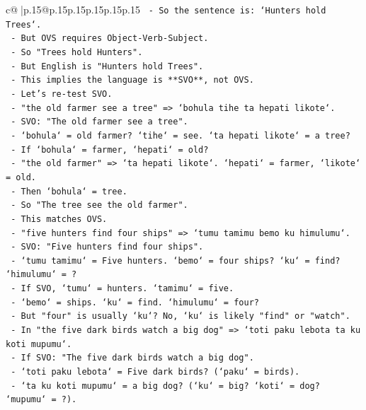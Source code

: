 \documentclass{article}
\begin{document}
{\begin{supertabular}{c@{$\;$}|p{.15\linewidth}@{}p{.15\linewidth}p{.15\linewidth}p{.15\linewidth}p{.15\linewidth}p{.15\linewidth}}
{{{\texttt{      {-} So the sentence is: `Hunters hold Trees`.} \\
\texttt{      {-} But OVS requires Object{-}Verb{-}Subject.} \\
\texttt{      {-} So "Trees hold Hunters".} \\
\texttt{      {-} But English is "Hunters hold Trees".} \\
\texttt{      {-} This implies the language is **SVO**, not OVS.} \\
\texttt{      {-} Let's re{-}test SVO.} \\
\texttt{      {-} "the old farmer see a tree" => `bohula tihe ta hepati likote`.} \\
\texttt{        {-} SVO: "The old farmer see a tree".} \\
\texttt{        {-} `bohula` = old farmer? `tihe` = see. `ta hepati likote` = a tree?} \\
\texttt{        {-} If `bohula` = farmer, `hepati` = old?} \\
\texttt{        {-} "the old farmer" => `ta hepati likote`. `hepati` = farmer, `likote` = old.} \\
\texttt{        {-} Then `bohula` = tree.} \\
\texttt{        {-} So "The tree see the old farmer".} \\
\texttt{        {-} This matches OVS.} \\
\texttt{      {-} "five hunters find four ships" => `tumu tamimu bemo ku himulumu`.} \\
\texttt{        {-} SVO: "Five hunters find four ships".} \\
\texttt{        {-} `tumu tamimu` = Five hunters. `bemo` = four ships? `ku` = find? `himulumu` = ?} \\
\texttt{        {-} If SVO, `tumu` = hunters. `tamimu` = five.} \\
\texttt{        {-} `bemo` = ships. `ku` = find. `himulumu` = four?} \\
\texttt{        {-} But "four" is usually `ku`? No, `ku` is likely "find" or "watch".} \\
\texttt{        {-} In "the five dark birds watch a big dog" => `toti paku lebota ta ku koti mupumu`.} \\
\texttt{          {-} If SVO: "The five dark birds watch a big dog".} \\
\texttt{          {-} `toti paku lebota` = Five dark birds? (`paku` = birds).} \\
\texttt{          {-} `ta ku koti mupumu` = a big dog? (`ku` = big? `koti` = dog? `mupumu` = ?).} \\
}}}
\end{supertabular}}
\end{document}
